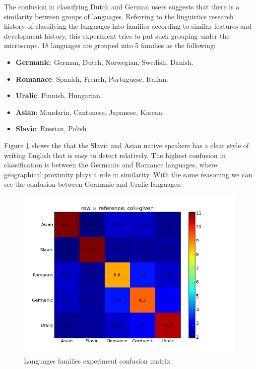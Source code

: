 \documentclass[11pt]{article}
\begin{document}
The confusion in classifying Dutch and German users suggests that there is a similarity between groups of languages. Referring to the linguistics research history of classifying the languages into families according to similar features and development history, this experiment tries to put such grouping under the microscope. 18 languages are grouped into 5 families as the following:
\begin{itemize}
\item \textbf{Germanic}: German, Dutch, Norwegian, Swedish, Danish.
\item \textbf{Romanace}: Spanish, French, Portuguese, Italian.
\item \textbf{Uralic}: Finnish, Hungarian.
\item \textbf{Asian}: Mandarin, Cantonese, Japanese, Korean.
\item \textbf{Slavic}: Russian, Polish
\end{itemize}

Figure \ref{fam_cfm} shows the that the Slavic and Asian native speakers has a clear style of writing English that is easy to detect relatively. The highest confusion in classification is between the Germanic and Romance languages, where geographical proximity plays a role in similarity. With the same reasoning we can see the confusion between Germanic and Uralic languages.

\begin{figure}[htp]
\centering
\includegraphics[scale=0.45]{family_cfm.png}
\caption{Languages families experiment confusion matrix}
\label{fam_cfm}
\end{figure}
\end{document}
